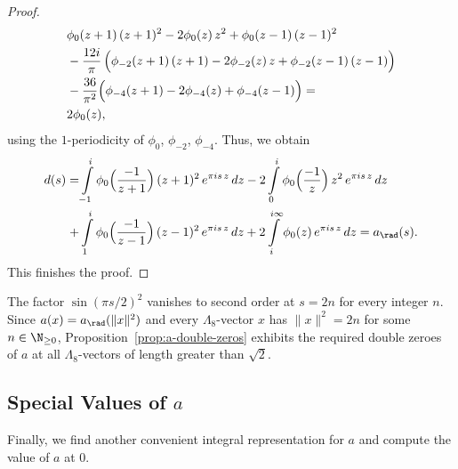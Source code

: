 \begin{proof}
\begin{align}
&\phi_0(z+1)\,(z+1)^2-2\phi_0(z)\,z^2+\phi_0(z-1)\,(z-1)^2\notag\\
&-\frac{12i}{\pi}\,\Big(\phi_{-2}(z+1)\,(z+1)-2\phi_{-2}(z)\,z+\phi_{-2}(z-1)\,(z-1)\Big)\notag\\
&-\frac{36}{\pi^2}\Big(\phi_{-4}(z+1)-2\phi_{-4}(z)+\phi_{-4}(z-1)\Big)=\notag\\
&2\phi_0(z),
\end{align}
using the $1$-periodicity of $\phi_0$, $\phi_{-2}$, $\phi_{-4}$. Thus, we obtain
\begin{align}
    d(s)=&\int\limits_{-1}^{i}\phi_0\Big(\frac{-1}{z+1}\Big)\,(z+1)^2\,e^{\pi i s \,z}\,dz
    -2\int\limits_{0}^{i}\phi_0\Big(\frac{-1}{z}\Big)\,z^2\,e^{\pi i s \,z}\,dz\notag\\
    +&\int\limits_{1}^{i}\phi_0\Big(\frac{-1}{z-1}\Big)\,(z-1)^2\,e^{\pi i s \,z}\,dz
    +2\int\limits_{i}^{i\infty}\phi_0(z)\,e^{\pi i s \,z}\,dz=a_\rad(s).\notag
\end{align}
This finishes the proof.
\end{proof}

The factor $\sin(\pi s/2)^2$ vanishes to second order at $s = 2n$ for every integer $n$. Since $a(x) = a_\rad(\|x\|^2)$ and every $\Lambda_8$-vector $x$ has $\|x\|^2 = 2n$ for some $n \in \N_{\geq 0}$, Proposition~\ref{prop:a-double-zeros} exhibits the required double zeroes of $a$ at all $\Lambda_8$-vectors of length greater than $\sqrt 2$.

\subsection{Special Values of $a$}

Finally, we find another convenient integral representation for $a$ and compute the value of $a$ at $0$.

